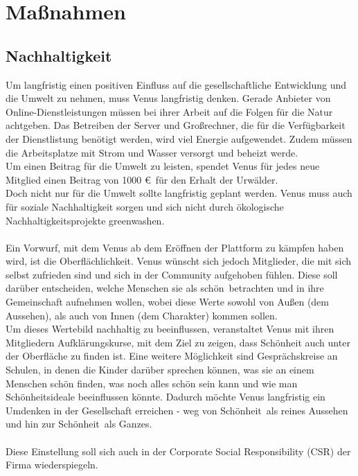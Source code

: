 \documentclass[a4paper, fontsize=12pt, parskip=full, toc=bibliographynumbered]{scrreprt}
\begin{document}




\chapter{Maßnahmen}

\section{Nachhaltigkeit}
\author{Autor: Leonie Schiburr}

Um langfristig einen positiven Einfluss auf die gesellschaftliche Entwicklung und die Umwelt zu nehmen, muss Venus langfristig denken.
Gerade Anbieter von Online-Dienstleistungen müssen bei ihrer Arbeit auf die Folgen für die Natur achtgeben. Das Betreiben der Server und
Großrechner, die für die Verfügbarkeit der Dienstlistung benötigt werden, wird viel Energie aufgewendet. Zudem müssen die Arbeitsplatze mit Strom 
und Wasser versorgt und beheizt werde.\\
Um einen Beitrag für die Umwelt zu leisten, spendet Venus für jedes neue Mitglied einen Beitrag von 1000 \euro~für den Erhalt der Urwälder. \\
Doch nicht nur für die Umwelt sollte langfristig geplant werden. Venus muss auch für soziale Nachhaltigkeit sorgen und sich nicht durch ökologische Nachhaltigkeitsprojekte \glqq greenwashen\grqq.\\
\\
Ein Vorwurf, mit dem Venus ab dem Eröffnen der Plattform zu kämpfen haben wird, ist die \glqq Oberflächlichkeit\grqq. Venus wünscht sich jedoch Mitglieder, die mit sich selbst zufrieden sind und sich in der Community aufgehoben fühlen. Diese soll darüber entscheiden, welche Menschen sie als \glqq schön\grqq~betrachten und in ihre Gemeinschaft aufnehmen wollen, wobei diese Werte sowohl von Außen (dem Aussehen), als auch von Innen (dem Charakter) kommen sollen.\\
Um dieses Wertebild nachhaltig zu beeinflussen, veranstaltet Venus mit ihren Mitgliedern Aufklärungskurse, mit dem Ziel zu zeigen, dass Schönheit auch unter der Oberfläche zu finden ist. Eine weitere Möglichkeit sind Gesprächskreise an Schulen, in denen die Kinder darüber sprechen können, was sie an einem Menschen schön finden, was noch alles schön sein kann und wie man Schönheitsideale beeinflussen könnte. Dadurch möchte Venus langfristig ein Umdenken in der Gesellschaft erreichen - weg von \glqq Schönheit\grqq~als reines Aussehen und hin zur \glqq Schönheit\grqq~als Ganzes.\\
\\
Diese Einstellung soll sich auch in der Corporate Social Responsibility (CSR) der Firma wiederspiegeln.
\end{document}
